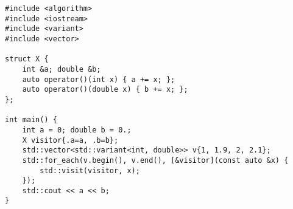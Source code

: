 \begin{lstlisting}[title=\href{https://godbolt.org/z/c7pUeb}{\texttt{godbolt.org/z/c7pUeb}}]
#include <algorithm>
#include <iostream>
#include <variant>
#include <vector>

struct X {
    int &a; double &b;
    auto operator()(int x) { a += x; };
    auto operator()(double x) { b += x; };
};

int main() {
    int a = 0; double b = 0.;
    X visitor{.a=a, .b=b};
    std::vector<std::variant<int, double>> v{1, 1.9, 2, 2.1};
    std::for_each(v.begin(), v.end(), [&visitor](const auto &x) {
        std::visit(visitor, x);
    });
    std::cout << a << b;
}
\end{lstlisting}
